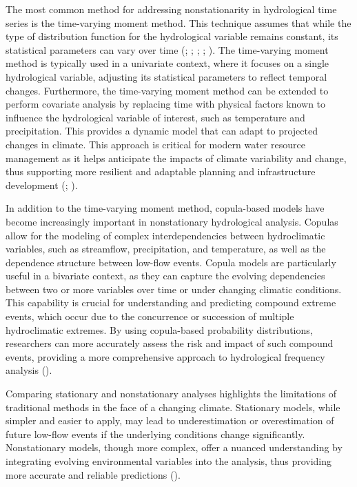 \documentclass[
]{krantz}
\begin{document}
The most common method for addressing nonstationarity in hydrological time series is the time-varying moment method. This technique assumes that while the type of distribution function for the hydrological variable remains constant, its statistical parameters can vary over time (\citet{Strupczewski2001}; \citet{Coles2001}; \citet{Katz2002}; \citet{Villarini2009}; \citet{Gilroy2012}). The time-varying moment method is typically used in a univariate context, where it focuses on a single hydrological variable, adjusting its statistical parameters to reflect temporal changes. Furthermore, the time-varying moment method can be extended to perform covariate analysis by replacing time with physical factors known to influence the hydrological variable of interest, such as temperature and precipitation. This provides a dynamic model that can adapt to projected changes in climate. This approach is critical for modern water resource management as it helps anticipate the impacts of climate variability and change, thus supporting more resilient and adaptable planning and infrastructure development (\citet{Du2015}; \citet{Jiang2015}).

In addition to the time-varying moment method, copula-based models have become increasingly important in nonstationary hydrological analysis. Copulas allow for the modeling of complex interdependencies between hydroclimatic variables, such as streamflow, precipitation, and temperature, as well as the dependence structure between low-flow events. Copula models are particularly useful in a bivariate context, as they can capture the evolving dependencies between two or more variables over time or under changing climatic conditions. This capability is crucial for understanding and predicting compound extreme events, which occur due to the concurrence or succession of multiple hydroclimatic extremes. By using copula-based probability distributions, researchers can more accurately assess the risk and impact of such compound events, providing a more comprehensive approach to hydrological frequency analysis (\citet{Tootoonchi2022}).

Comparing stationary and nonstationary analyses highlights the limitations of traditional methods in the face of a changing climate. Stationary models, while simpler and easier to apply, may lead to underestimation or overestimation of future low-flow events if the underlying conditions change significantly. Nonstationary models, though more complex, offer a nuanced understanding by integrating evolving environmental variables into the analysis, thus providing more accurate and reliable predictions (\citet{Du2015}).
\end{document}

